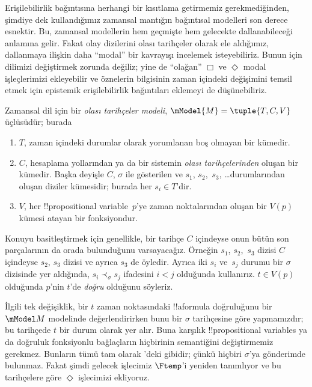 \documentclass[../../../include/open-logic-section]{subfiles}
\begin{document}


Erişilebilirlik bağıntısına herhangi bir kısıtlama getirmemiz gerekmediğinden,
şimdiye dek kullandığımız zamansal mantığın bağıntısal modelleri son derece
esnektir. Bu, zamansal modellerin hem geçmişte hem gelecekte dallanabileceği
anlamına gelir. Fakat olay dizilerini olası tarihçeler olarak ele aldığımız,
dallanmaya ilişkin daha ``modal'' bir kavrayışı incelemek isteyebiliriz. Bunun
için dilimizi değiştirmek zorunda değiliz; yine de ``olağan'' $\Box$ ve
$\Diamond$ modal işleçlerimizi ekleyebilir ve öznelerin bilgisinin zaman
içindeki değişimini temsil etmek için epistemik erişilebilirlik bağıntıları
eklemeyi de düşünebiliriz.

\begin{defn}
  Zamansal dil için bir \emph{olası tarihçeler modeli},
  $\mModel{M}=\tuple{T,C,V}$ üçlüsüdür; burada
  \begin{enumerate}
    \item $T$, zaman içindeki durumlar olarak yorumlanan boş olmayan bir kümedir.
    \item $C$, hesaplama yollarından ya da bir sistemin \emph{olası
      tarihçelerinden} oluşan bir kümedir. Başka deyişle $C$, $\sigma$ ile
      gösterilen ve $s_1$, $s_2$,~$s_3$, \dots durumlarından oluşan diziler
      kümesidir; burada her $s_i\in T$'dir.
    \item $V$, her !!{propositional variable}~$p$'ye zaman noktalarından
      oluşan bir $V(p)$ kümesi atayan bir fonksiyondur.
  \end{enumerate}
  Konuyu basitleştirmek için genellikle, bir tarihçe $C$ içindeyse onun bütün
  son parçalarının da orada bulunduğunu varsayacağız. Örneğin $s_1$,
  $s_2$,~$s_3$ dizisi $C$ içindeyse $s_2$, $s_3$ dizisi ve ayrıca $s_3$ de
  öyledir. Ayrıca iki $s_i$ ve~$s_j$ durumu bir $\sigma$ dizisinde
  yer aldığında, $s_i\prec_\sigma s_j$ ifadesini $i<j$ olduğunda kullanırız.
  $t\in V(p)$
  olduğunda $p$'nin $t$'de \emph{doğru} olduğunu söyleriz.
\end{defn}

İlgili tek değişiklik, bir $t$ zaman noktasındaki !!a{formula} doğruluğunu
bir $\mModel M$ modelinde değerlendirirken bunu bir $\sigma$ tarihçesine
göre yapmamızdır; bu tarihçede $t$ bir durum olarak yer alır. Buna karşılık
!!{propositional variable}s ya da doğruluk fonksiyonlu bağlaçların hiçbirinin
semantiğini değiştirmemiz gerekmez. Bunların tümü tam olarak
'deki gibidir; çünkü hiçbiri $\sigma$'ya gönderimde
bulunmaz. Fakat şimdi gelecek işlecimiz $\Ftemp$'i yeniden tanımlıyor ve bu
tarihçelere göre $\Diamond$ işlecimizi ekliyoruz.
\end{document}
